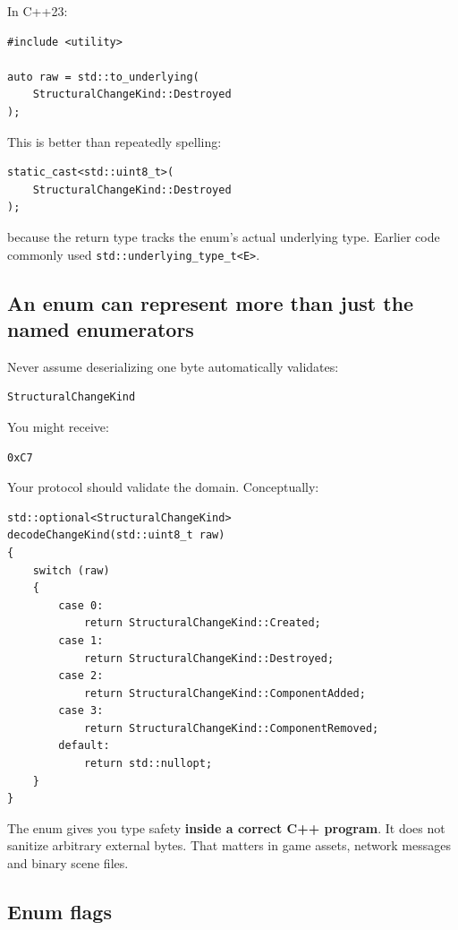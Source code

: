 In C++23:

\begin{verbatim}
#include <utility>

auto raw = std::to_underlying(
    StructuralChangeKind::Destroyed
);
\end{verbatim}

This is better than repeatedly spelling:

\begin{verbatim}
static_cast<std::uint8_t>(
    StructuralChangeKind::Destroyed
);
\end{verbatim}

because the return type tracks the enum's actual underlying type. Earlier code commonly used \texttt{std::underlying\_type\_t\textless{}E\textgreater{}}.

\subsection{An enum can represent more than just the named enumerators}\label{05-engine-i-ch003-an-enum-can-represent-more-than-just-the-named-enumerators}

Never assume deserializing one byte automatically validates:

\begin{verbatim}
StructuralChangeKind
\end{verbatim}

You might receive:

\begin{verbatim}
0xC7
\end{verbatim}

Your protocol should validate the domain. Conceptually:

\begin{verbatim}
std::optional<StructuralChangeKind>
decodeChangeKind(std::uint8_t raw)
{
    switch (raw)
    {
        case 0:
            return StructuralChangeKind::Created;
        case 1:
            return StructuralChangeKind::Destroyed;
        case 2:
            return StructuralChangeKind::ComponentAdded;
        case 3:
            return StructuralChangeKind::ComponentRemoved;
        default:
            return std::nullopt;
    }
}
\end{verbatim}

The enum gives you type safety \textbf{inside a correct C++ program}. It does not sanitize arbitrary external bytes. That matters in game assets, network messages and binary scene files.

\subsection{Enum flags}\label{05-engine-i-ch003-enum-flags}

